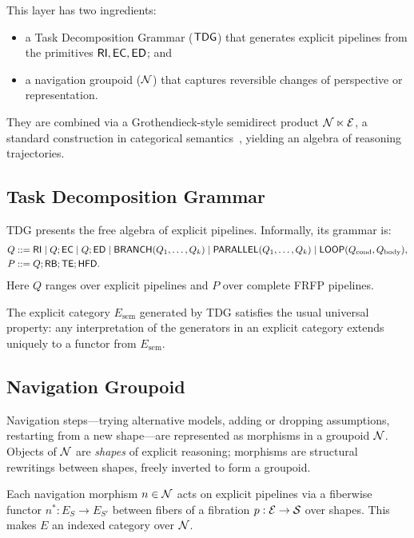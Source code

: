 This layer has two ingredients:
\begin{itemize}[leftmargin=2em]
  \item a Task Decomposition Grammar (\(\mathsf{TDG}\)) that generates explicit
        pipelines from the primitives \(\mathsf{RI},\mathsf{EC},\mathsf{ED}\); and
  \item a navigation groupoid (\(\mathcal{N}\)) that captures reversible
        changes of perspective or representation.
\end{itemize}
They are combined via a Grothendieck-style semidirect product
\(\mathcal{N} \ltimes \mathcal{E}\), a standard construction in categorical
semantics~\cite{MacLane1998,Awodey2010,Borceux1994}, yielding an algebra
of reasoning trajectories.


\subsection{Task Decomposition Grammar}

TDG presents the free algebra of explicit pipelines. Informally, its grammar is:
\begin{align*}
Q &::= \mathsf{RI} \mid Q;\mathsf{EC} \mid Q;\mathsf{ED} \mid
        \mathsf{BRANCH}(Q_1,\dots,Q_k) \mid
        \mathsf{PARALLEL}(Q_1,\dots,Q_k) \mid
        \mathsf{LOOP}(Q_{\mathrm{cond}},Q_{\mathrm{body}}),\\
P &::= Q;\mathsf{RB};\mathsf{TE};\mathsf{HFD}.
\end{align*}
Here \(Q\) ranges over explicit pipelines and \(P\) over complete FRFP
pipelines.

The explicit category \(E_{\mathrm{sem}}\) generated by TDG satisfies the
usual universal property: any interpretation of the generators in an
explicit category extends uniquely to a functor from \(E_{\mathrm{sem}}\).

\subsection{Navigation Groupoid}

Navigation steps---trying alternative models, adding or dropping
assumptions, restarting from a new shape---are represented as morphisms
in a groupoid \(\mathcal{N}\). Objects of \(\mathcal{N}\) are \emph{shapes} of
explicit reasoning; morphisms are structural rewritings between shapes,
freely inverted to form a groupoid.

Each navigation morphism \(n\in\mathcal{N}\) acts on explicit pipelines
via a fiberwise functor \(n^\ast:E_S\to E_{S'}\) between fibers of a
fibration \(p:\mathcal{E}\to\mathcal{S}\) over shapes. This makes \(E\) an indexed
category over \(\mathcal{N}\).

